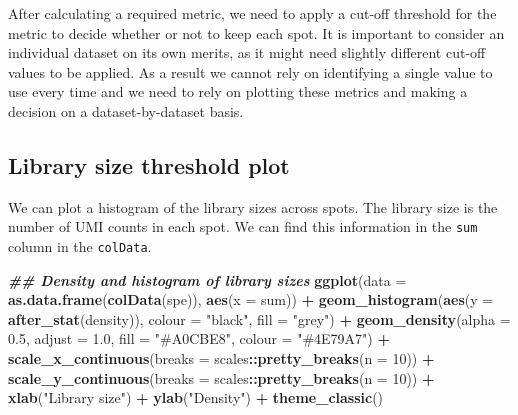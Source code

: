 \documentclass[
]{book}
\newenvironment{Shaded}{\begin{snugshade}}{\end{snugshade}}
\newcommand{\AttributeTok}[1]{\textcolor[rgb]{0.13,0.29,0.53}{#1}}
\newcommand{\DecValTok}[1]{\textcolor[rgb]{0.00,0.00,0.81}{#1}}
\newcommand{\DocumentationTok}[1]{\textcolor[rgb]{0.56,0.35,0.01}{\textbf{\textit{#1}}}}
\newcommand{\FloatTok}[1]{\textcolor[rgb]{0.00,0.00,0.81}{#1}}
\newcommand{\FunctionTok}[1]{\textcolor[rgb]{0.13,0.29,0.53}{\textbf{#1}}}
\newcommand{\NormalTok}[1]{#1}
\newcommand{\SpecialCharTok}[1]{\textcolor[rgb]{0.81,0.36,0.00}{\textbf{#1}}}
\newcommand{\StringTok}[1]{\textcolor[rgb]{0.31,0.60,0.02}{#1}}
\begin{document}
After calculating a required metric, we need to apply a cut-off threshold for the metric to decide whether or not to keep each spot. It is important to consider an individual dataset on its own merits, as it might need slightly different cut-off values to be applied. As a result we cannot rely on identifying a single value to use every time and we need to rely on plotting these metrics and making a decision on a dataset-by-dataset basis.

\hypertarget{library-size-threshold-plot}{%
\subsection{Library size threshold plot}\label{library-size-threshold-plot}}

We can plot a histogram of the library sizes across spots. The library size is the number of UMI counts in each spot. We can find this information in the \texttt{sum} column in the \texttt{colData}.

\begin{Shaded}
\begin{Highlighting}[]
\DocumentationTok{\#\# Density and histogram of library sizes}
\FunctionTok{ggplot}\NormalTok{(}\AttributeTok{data =} \FunctionTok{as.data.frame}\NormalTok{(}\FunctionTok{colData}\NormalTok{(spe)),}
       \FunctionTok{aes}\NormalTok{(}\AttributeTok{x =}\NormalTok{ sum)) }\SpecialCharTok{+}
  \FunctionTok{geom\_histogram}\NormalTok{(}\FunctionTok{aes}\NormalTok{(}\AttributeTok{y =} \FunctionTok{after\_stat}\NormalTok{(density)), }
                 \AttributeTok{colour =} \StringTok{"black"}\NormalTok{, }
                 \AttributeTok{fill =} \StringTok{"grey"}\NormalTok{) }\SpecialCharTok{+}
  \FunctionTok{geom\_density}\NormalTok{(}\AttributeTok{alpha =} \FloatTok{0.5}\NormalTok{,}
               \AttributeTok{adjust =} \FloatTok{1.0}\NormalTok{,}
               \AttributeTok{fill =} \StringTok{"\#A0CBE8"}\NormalTok{,}
               \AttributeTok{colour =} \StringTok{"\#4E79A7"}\NormalTok{) }\SpecialCharTok{+}
  \FunctionTok{scale\_x\_continuous}\NormalTok{(}\AttributeTok{breaks =}\NormalTok{ scales}\SpecialCharTok{::}\FunctionTok{pretty\_breaks}\NormalTok{(}\AttributeTok{n =} \DecValTok{10}\NormalTok{)) }\SpecialCharTok{+} 
  \FunctionTok{scale\_y\_continuous}\NormalTok{(}\AttributeTok{breaks =}\NormalTok{ scales}\SpecialCharTok{::}\FunctionTok{pretty\_breaks}\NormalTok{(}\AttributeTok{n =} \DecValTok{10}\NormalTok{)) }\SpecialCharTok{+} 
  \FunctionTok{xlab}\NormalTok{(}\StringTok{"Library size"}\NormalTok{) }\SpecialCharTok{+} 
  \FunctionTok{ylab}\NormalTok{(}\StringTok{"Density"}\NormalTok{) }\SpecialCharTok{+} 
  \FunctionTok{theme\_classic}\NormalTok{()}
\end{Highlighting}
\end{Shaded}
\end{document}
